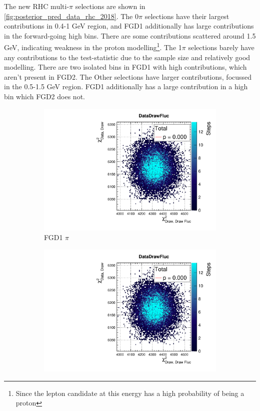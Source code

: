 The new RHC multi-$\pi$ selections are shown in \autoref{fig:posterior_pred_data_rhc_2018}. The 0$\pi$ selections have their largest contributions in 0.4-1 GeV region, and FGD1 additionally has large contributions in the forward-going high \pmu bins. There are some contributions scattered around 1.5 GeV, indicating weakness in the proton modelling\footnote{Since the lepton candidate at this energy has a high probability of being a proton}. The 1$\pi$ selections barely have any contributions to the test-statistic due to the sample size and relatively good modelling. There are two isolated bins in FGD1 with high contributions, which aren't present in FGD2. The Other selections have larger contributions, focussed in the 0.5-1.5 GeV region. FGD1 additionally has a large contribution in a high \pmu bin which FGD2 does not. 
\begin{figure}[h]
	\begin{subfigure}[t]{0.32\textwidth}
		\includegraphics[width=\textwidth, trim={20mm 6mm 4mm 11mm}, clip,page=61]{figures/mach3/2018/data/2018a_FixedCov_RedCov_Mpi_Data_merge_PostPredStore_FullLLH_procs}
		\caption{FGD1 $\pi$}
	\end{subfigure}
	\begin{subfigure}[t]{0.32\textwidth}
		\includegraphics[width=\textwidth, trim={20mm 6mm 4mm 11mm}, clip,page=70]{figures/mach3/2018/data/2018a_FixedCov_RedCov_Mpi_Data_merge_PostPredStore_FullLLH_procs}

\end{subfigure}
\end{figure}
